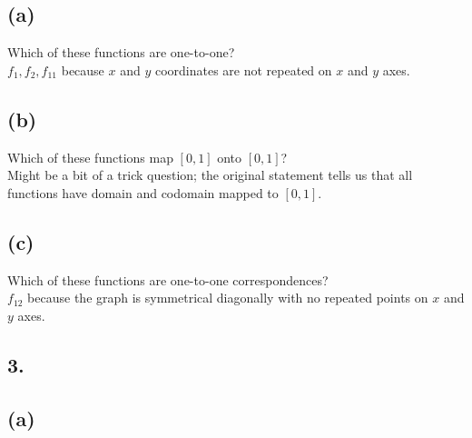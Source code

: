 \documentclass[11pt]{article}
\begin{document}
\subsection*{(a)}
\begin{center}
Which of these functions are one-to-one?\\
\hfill \break
$f_1, f_2, f_{11}$ because $x$ and $y$ coordinates are not repeated on $x$ and $y$ axes.
\end{center}

\hfill \break
\subsection*{(b)}
\begin{center}
Which of these functions map $[0,1]$ onto $[0,1]$?\\
\hfill \break
Might be a bit of a trick question; the original statement tells us that all functions have domain and codomain mapped to $[0,1]$.
\end{center}

\subsection*{(c)}
\begin{center}
Which of these functions are one-to-one correspondences?\\
\hfill \break
$f_{12}$ because the graph is symmetrical diagonally with no repeated points on $x$ and $y$ axes.
\end{center}
%
%
\subsection*{3.}
\begin{center}

\end{center}

\subsection*{(a)}
\begin{center}

\hfill \break

\end{center}
%
%
\end{document}
